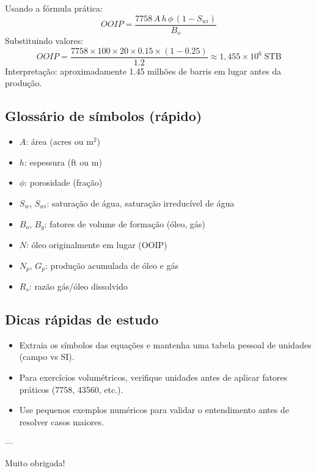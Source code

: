 \documentclass[11pt,a4paper]{article}
\begin{document}
Usando a fórmula prática:
$$
OOIP = \frac{7758\,A\,h\,\phi\,(1-S_{wi})}{B_o}
$$
Substituindo valores:
$$
OOIP = \frac{7758 \times 100 \times 20 \times 0.15 \times (1-0.25)}{1.2} \approx 1{,}455\times10^{6}\;\text{STB}
$$
Interpretação: aproximadamente 1.45 milhões de barris em lugar antes da produção.

\subsection{Glossário de símbolos (rápido)}
\begin{itemize}
\item $A$: área (acres ou m$^2$)
\item $h$: espessura (ft ou m)
\item $\phi$: porosidade (fração)
\item $S_w$, $S_{wi}$: saturação de água, saturação irreducível de água
\item $B_o$, $B_g$: fatores de volume de formação (óleo, gás)
\item $N$: óleo originalmente em lugar (OOIP)
\item $N_p$, $G_p$: produção acumulada de óleo e gás
\item $R_s$: razão gás/óleo dissolvido
\end{itemize}

\subsection{Dicas rápidas de estudo}
\begin{itemize}
\item Extraia os símbolos das equações e mantenha uma tabela pessoal de unidades (campo vs SI).
\item Para exercícios volumétricos, verifique unidades antes de aplicar fatores práticos (7758, 43560, etc.).
\item Use pequenos exemplos numéricos para validar o entendimento antes de resolver casos maiores.
\end{itemize}

---

Muito obrigada!
\end{document}
